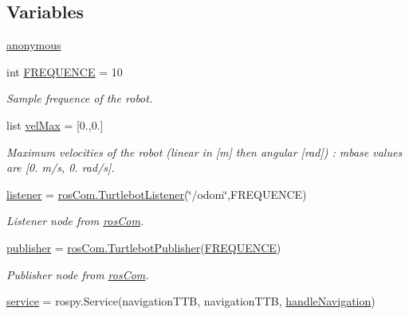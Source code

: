 \subsection*{Variables}
\begin{DoxyCompactItemize}
\item 
\hyperlink{namespacecmd__TTB_1_1cmd__ouverture_a77e047b8c9fe806c29d099b045513d1e}{anonymous}
\item 
int \hyperlink{namespacecmd__TTB_1_1cmd__ouverture_acccb0c5132d862843c65fc361ebbc8f4}{F\+R\+E\+Q\+U\+E\+N\+CE} = 10
\begin{DoxyCompactList}\small\item\em Sample frequence of the robot. \end{DoxyCompactList}\item 
list \hyperlink{namespacecmd__TTB_1_1cmd__ouverture_af294464cb92aea691b05f1097a4ea28d}{vel\+Max} = \mbox{[}0.,0.\mbox{]}
\begin{DoxyCompactList}\small\item\em Maximum velocities of the robot (linear in \mbox{[}m\mbox{]} then angular \mbox{[}rad\mbox{]}) \+: mbase values are \mbox{[}0. m/s, 0. rad/s\mbox{]}. \end{DoxyCompactList}\item 
\hyperlink{namespacecmd__TTB_1_1cmd__ouverture_a24119bb105d758e611e887c6d4c2a2b1}{listener} = \hyperlink{classcmd__TTB_1_1rosCom_1_1TurtlebotListener}{ros\+Com.\+Turtlebot\+Listener}(\char`\"{}/odom\char`\"{},F\+R\+E\+Q\+U\+E\+N\+CE)
\begin{DoxyCompactList}\small\item\em Listener node from \hyperlink{namespacecmd__TTB_1_1rosCom}{ros\+Com}. \end{DoxyCompactList}\item 
\hyperlink{namespacecmd__TTB_1_1cmd__ouverture_a453ff2743ee8d9e0d8a9827f06ad3a4a}{publisher} = \hyperlink{classcmd__TTB_1_1rosCom_1_1TurtlebotPublisher}{ros\+Com.\+Turtlebot\+Publisher}(\hyperlink{namespacecmd__TTB_1_1cmd__ouverture_acccb0c5132d862843c65fc361ebbc8f4}{F\+R\+E\+Q\+U\+E\+N\+CE})
\begin{DoxyCompactList}\small\item\em Publisher node from \hyperlink{namespacecmd__TTB_1_1rosCom}{ros\+Com}. \end{DoxyCompactList}\item 
\hyperlink{namespacecmd__TTB_1_1cmd__ouverture_ae3d69e9c63df8aea84f2ae92f853d24f}{service} = rospy.\+Service(\textquotesingle{}navigation\+T\+TB\textquotesingle{}, navigation\+T\+TB, \hyperlink{namespacecmd__TTB_1_1cmd__ouverture_a69046dc4c4b699caef9e459f6620a389}{handle\+Navigation})
\end{DoxyCompactItemize}


